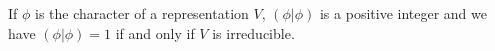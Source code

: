 If $\phi$ is the character of a representation $V$, $(\phi|\phi)$ is a positive integer and we have $(\phi|\phi) = 1$ if and only if $V$ is irreducible.
